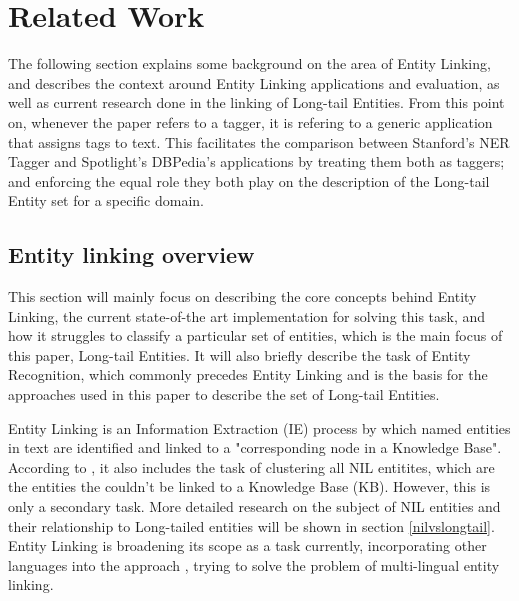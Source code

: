 \section{Related Work} %
The following section explains some background on the area of Entity Linking,
and describes the context around Entity Linking applications and evaluation,
as well as current research done in the linking of Long-tail Entities.
From this point on, whenever the paper refers to a tagger, it is refering to a generic application that assigns tags to text.
This facilitates the comparison between Stanford's NER Tagger and Spotlight's DBPedia's applications by treating them both as taggers;
and enforcing the equal role they both play on the description of the Long-tail Entity set for a specific domain.

\subsection{Entity linking overview} %

This section will mainly focus on describing the core concepts behind Entity Linking, the current state-of-the art implementation for solving this task, and how it struggles to classify a particular set of entities, which is the main focus of this paper, Long-tail Entities.
It will also briefly describe the task of Entity Recognition, which commonly precedes Entity Linking and is the basis for the approaches used in this paper to describe the set of Long-tail Entities.

Entity Linking is an Information Extraction (IE) process by which named entities in text are identified and linked to a
"corresponding node in a Knowledge Base"\cite{rw_elo_HACHEY2013130}. 
According to \cite{silone}, it also includes the task of clustering all NIL entitites, which are the entities the couldn't be linked to a Knowledge Base (KB).
However, this is only a secondary task. More detailed research on the subject of NIL entities and their relationship to Long-tailed entities will be shown
in section \ref{nilvslongtail}.
Entity Linking is broadening its scope as a task currently, incorporating other languages into the approach \cite{silone}, trying to solve the problem
of multi-lingual entity linking. 

